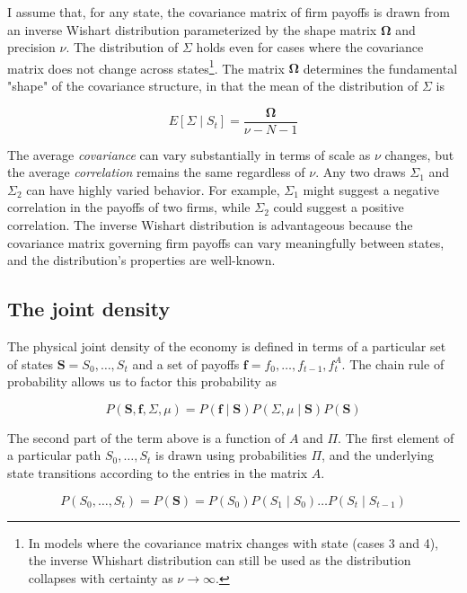\documentclass{article}
\begin{document}
\newcommand{\Shape}{\mathbf{\Omega}}

I assume that, for any state, the covariance matrix of firm payoffs is drawn from an inverse Wishart distribution parameterized by the shape matrix $\Shape$ and precision $\nu$. The distribution of $\Sigma$ holds even for cases where the covariance matrix does not change across states\footnote{In models where the covariance matrix changes with state (cases 3 and 4), the inverse Whishart distribution can still be used as the distribution collapses with certainty as $\nu \rightarrow \infty$.}. The matrix $\Shape$ determines the fundamental "shape" of the covariance structure, in that the mean of the distribution of $\Sigma$ is 

$$
E[\Sigma \mid S_t] = \frac{\Shape}{\nu - N - 1}
$$

The average \textit{covariance} can vary substantially in terms of scale as $\nu$ changes, but the average \textit{correlation} remains the same regardless of $\nu$. Any two draws $\Sigma_1$ and $\Sigma_2$ can have highly varied behavior. For example, $\Sigma_1$ might suggest a negative correlation in the payoffs of two firms, while $\Sigma_2$ could suggest a positive correlation. The inverse Wishart distribution is advantageous because the covariance matrix governing firm payoffs can vary meaningfully between states, and the distribution's properties are well-known.

\subsection*{The joint density}

\newcommand{\Slist}{S_0, \dots, S_t}
\newcommand{\Flist}{f_0, \dots, f_{t-1}, f_{t}^A}
\newcommand{\States}{\mathbf{S}}
\newcommand{\Payoffs}{\mathbf{f}}

The physical joint density of the economy is defined in terms of a particular set of states $\States = \Slist$ and a set of payoffs $\Payoffs = \Flist$. The chain rule of probability allows us to factor this probability as

$$
P(\States, \Payoffs, \Sigma, \mu) = P(\Payoffs \mid \States) P(\Sigma, \mu \mid \States) P(\States)
$$

The second part of the term above is a function of $A$ and $\Pi$. The first element of a particular path $\Slist$ is drawn using probabilities $\Pi$, and the underlying state transitions according to the entries in the matrix $A$. 

$$
P(\Slist) = P(\States) = P(S_0)P(S_1 \mid S_0) \dots P(S_t \mid S_{t-1})
$$
\end{document}
